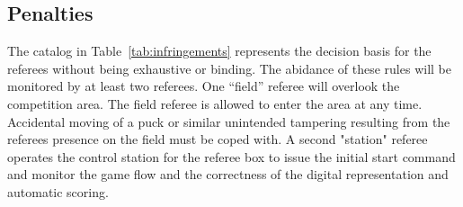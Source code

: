 \documentclass[12pt,twoside]{article}
\begin{document}
\subsection{Penalties}
The catalog in Table~\ref{tab:infringements} represents the decision
basis for the referees without being exhaustive or binding.
%
The abidance of these rules will be monitored by at least two
referees.  One ``field'' referee will overlook the competition
area. The field referee is allowed to enter the area at any
time. Accidental moving of a puck or similar unintended tampering
resulting from the referees presence on the field must be coped
with. A second "station" referee operates the control station for the
referee box to issue the initial start command and monitor the game
flow and the correctness of the digital representation and automatic
scoring.
\end{document}
